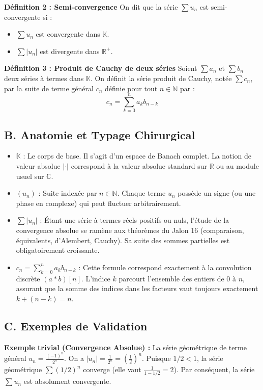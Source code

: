 \documentclass[12pt,a4paper]{report}
\begin{document}
\textbf{Définition 2 : Semi-convergence}
On dit que la série $\sum u_n$ est semi-convergente si :
\begin{itemize}
\item $\sum u_n$ est convergente dans $\mathbb{K}$.
\item $\sum |u_n|$ est divergente dans $\mathbb{R}^+$.
\end{itemize}

\textbf{Définition 3 : Produit de Cauchy de deux séries}
Soient $\sum a_n$ et $\sum b_n$ deux séries à termes dans $\mathbb{K}$. On définit la série produit de Cauchy, notée $\sum c_n$, par la suite de terme général $c_n$ définie pour tout $n \in \mathbb{N}$ par :
$$c_n = \sum_{k=0}^n a_k b_{n-k}$$

\subsection{B. Anatomie et Typage Chirurgical}

\begin{itemize}
\item $\mathbb{K}$ : Le corps de base. Il s'agit d'un espace de Banach complet. La notion de valeur absolue $| \cdot |$ correspond à la valeur absolue standard sur $\mathbb{R}$ ou au module usuel sur $\mathbb{C}$.
\item $(u_n)$ : Suite indexée par $n \in \mathbb{N}$. Chaque terme $u_n$ possède un signe (ou une phase en complexe) qui peut fluctuer arbitrairement.
\item $\sum |u_n|$ : Étant une série à termes réels positifs ou nuls, l'étude de la convergence absolue se ramène aux théorèmes du Jalon 16 (comparaison, équivalents, d'Alembert, Cauchy). Sa suite des sommes partielles est obligatoirement croissante.
\item $c_n = \sum_{k=0}^n a_k b_{n-k}$ : Cette formule correspond exactement à la convolution discrète $(a \ast b)[n]$. L'indice $k$ parcourt l'ensemble des entiers de $0$ à $n$, assurant que la somme des indices dans les facteurs vaut toujours exactement $k + (n - k) = n$.
\end{itemize}

\subsection{C. Exemples de Validation}

\textbf{Exemple trivial (Convergence Absolue) :}
La série géométrique de terme général $u_n = \frac{(-1)^n}{2^n}$.
On a $|u_n| = \frac{1}{2^n} = (\frac{1}{2})^n$. Puisque $1/2 < 1$, la série géométrique $\sum (1/2)^n$ converge (elle vaut $\frac{1}{1 - 1/2} = 2$). Par conséquent, la série $\sum u_n$ est absolument convergente.
\end{document}
